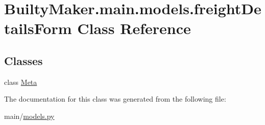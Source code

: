 \hypertarget{classBuiltyMaker_1_1main_1_1models_1_1freightDetailsForm}{\section{\-Builty\-Maker.\-main.\-models.\-freight\-Details\-Form \-Class \-Reference}
\label{classBuiltyMaker_1_1main_1_1models_1_1freightDetailsForm}
}
\subsection*{\-Classes}
\begin{DoxyCompactItemize}
\item 
class \hyperlink{classBuiltyMaker_1_1main_1_1models_1_1freightDetailsForm_1_1Meta}{\-Meta}
\end{DoxyCompactItemize}


\-The documentation for this class was generated from the following file\-:\begin{DoxyCompactItemize}
\item 
main/\hyperlink{models_8py}{models.\-py}\end{DoxyCompactItemize}
